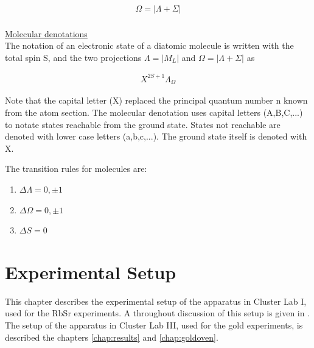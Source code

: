 \documentclass[parskip,12pt,headsepline,a4paper] {scrbook}
\begin{document}
\begin{align}  \label{omega-ls}
\Omega = |\Lambda + \Sigma|
\end{align}\\


\underline{Molecular denotations} \\
The notation of an electronic state of a diatomic molecule is written with the total spin S, and the two projections $\Lambda = |M_L|$ and $\Omega = |\Lambda + \Sigma|$ as

\begin{align}  \label{mole-denotation}
X^{2S+1}\Lambda_{\Omega}
\end{align}

Note that the capital letter (X) replaced the principal quantum number n known from the atom section. The molecular denotation uses capital letters (A,B,C,...) to notate states reachable from the ground state. States not reachable are denoted with lower case letters (a,b,c,...). The ground state itself is denoted with X.

The transition rules for molecules are:

\begin{enumerate}
\item $\Delta \Lambda = 0, \pm 1$
\item $\Delta \Omega = 0, \pm1$
\item $\Delta S = 0$
\end{enumerate}



\chapter{Experimental Setup}
\label{chap:expsetup}
This chapter describes the experimental setup of the apparatus in Cluster Lab I, used for the RbSr experiments. A throughout discussion of this setup is given in \cite{nagl}. The setup of the apparatus in Cluster Lab III, used for the gold experiments, is described the chapters \ref{chap:results} and \ref{chap:goldoven}.
\end{document}
